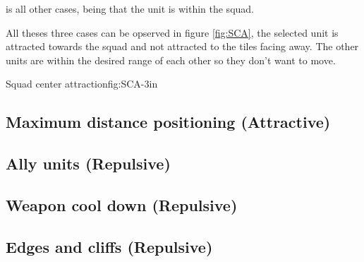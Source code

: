 		 is all other cases, being that the unit is within the squad.
		
		All theses three cases can be opserved in figure \ref{fig:SCA}, the selected unit is attracted towards the squad and not attracted to the tiles facing away. The other units are within the desired range of each other so they don't want to move.
		
		

			{Squad center attraction}{fig:SCA}{-3in}
	
	\subsection*{Maximum distance positioning (Attractive)}
	\subsection*{Ally units (Repulsive)}
	\subsection*{Weapon cool down (Repulsive)}
	\subsection*{Edges and cliffs (Repulsive)}